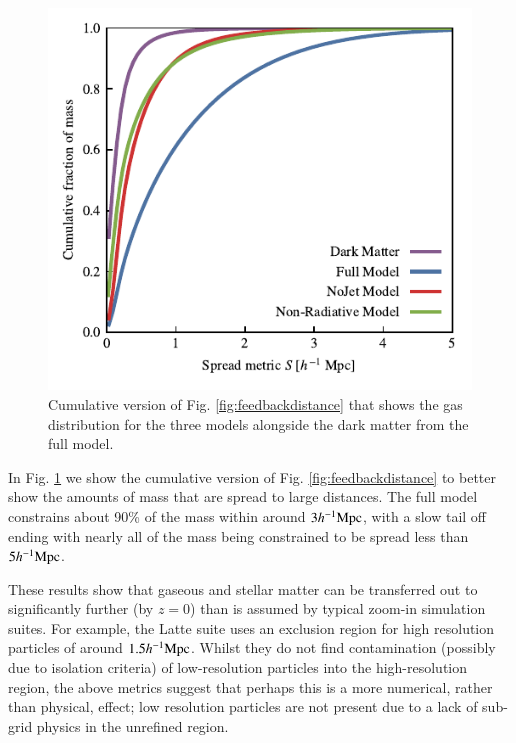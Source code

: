 \begin{figure}
    \centering
    \includegraphics{figures/cumulative_histogram_comparison.pdf}
    \vspace{-0.7cm}
    \caption{Cumulative version of Fig. \ref{fig:feedbackdistance} that
    shows the gas distribution for the three models alongside the dark
    matter from the full model.}
    \label{fig:cumulativehistogram}
\end{figure}

In Fig. \ref{fig:cumulativehistogram} we show the cumulative version of Fig.
\ref{fig:feedbackdistance} to better show the amounts of mass that are spread
to large distances. The full model constrains about 90\% of the mass within
around $3h^{-1}{\rm Mpc}{}$, with a slow tail off ending with nearly all of the mass
being constrained to be spread less than $5h^{-1}{\rm Mpc}{}$.

These results show that gaseous and stellar matter can be transferred out to
significantly further (by $z=0$) than is assumed by typical zoom-in
simulation suites. For example, the Latte \citep{Wetzel2016} suite uses an
exclusion region for high resolution particles of around $1.5 h^{-1}{\rm Mpc}{}$.
Whilst they do not find contamination (possibly due to isolation criteria) of
low-resolution particles into the high-resolution region, the above metrics
suggest that perhaps this is a more numerical, rather than physical, effect;
low resolution particles are not present due to a lack of sub-grid physics in
the unrefined region.
